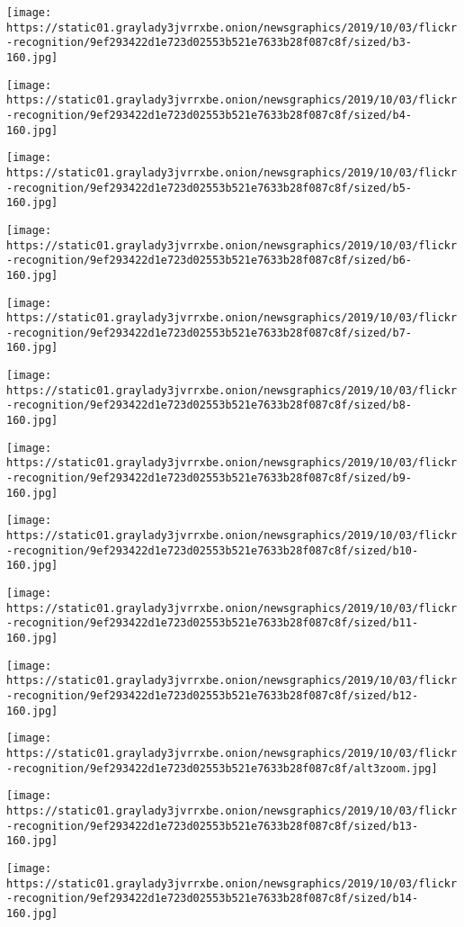 \texttt{[image: https://static01.graylady3jvrrxbe.onion/newsgraphics/2019/10/03/flickr-recognition/9ef293422d1e723d02553b521e7633b28f087c8f/sized/b3-160.jpg]}

\texttt{[image: https://static01.graylady3jvrrxbe.onion/newsgraphics/2019/10/03/flickr-recognition/9ef293422d1e723d02553b521e7633b28f087c8f/sized/b4-160.jpg]}

\texttt{[image: https://static01.graylady3jvrrxbe.onion/newsgraphics/2019/10/03/flickr-recognition/9ef293422d1e723d02553b521e7633b28f087c8f/sized/b5-160.jpg]}

\texttt{[image: https://static01.graylady3jvrrxbe.onion/newsgraphics/2019/10/03/flickr-recognition/9ef293422d1e723d02553b521e7633b28f087c8f/sized/b6-160.jpg]}

\texttt{[image: https://static01.graylady3jvrrxbe.onion/newsgraphics/2019/10/03/flickr-recognition/9ef293422d1e723d02553b521e7633b28f087c8f/sized/b7-160.jpg]}

\texttt{[image: https://static01.graylady3jvrrxbe.onion/newsgraphics/2019/10/03/flickr-recognition/9ef293422d1e723d02553b521e7633b28f087c8f/sized/b8-160.jpg]}

\texttt{[image: https://static01.graylady3jvrrxbe.onion/newsgraphics/2019/10/03/flickr-recognition/9ef293422d1e723d02553b521e7633b28f087c8f/sized/b9-160.jpg]}

\texttt{[image: https://static01.graylady3jvrrxbe.onion/newsgraphics/2019/10/03/flickr-recognition/9ef293422d1e723d02553b521e7633b28f087c8f/sized/b10-160.jpg]}

\texttt{[image: https://static01.graylady3jvrrxbe.onion/newsgraphics/2019/10/03/flickr-recognition/9ef293422d1e723d02553b521e7633b28f087c8f/sized/b11-160.jpg]}

\texttt{[image: https://static01.graylady3jvrrxbe.onion/newsgraphics/2019/10/03/flickr-recognition/9ef293422d1e723d02553b521e7633b28f087c8f/sized/b12-160.jpg]}

\texttt{[image: https://static01.graylady3jvrrxbe.onion/newsgraphics/2019/10/03/flickr-recognition/9ef293422d1e723d02553b521e7633b28f087c8f/alt3zoom.jpg]}

\texttt{[image: https://static01.graylady3jvrrxbe.onion/newsgraphics/2019/10/03/flickr-recognition/9ef293422d1e723d02553b521e7633b28f087c8f/sized/b13-160.jpg]}

\texttt{[image: https://static01.graylady3jvrrxbe.onion/newsgraphics/2019/10/03/flickr-recognition/9ef293422d1e723d02553b521e7633b28f087c8f/sized/b14-160.jpg]}

